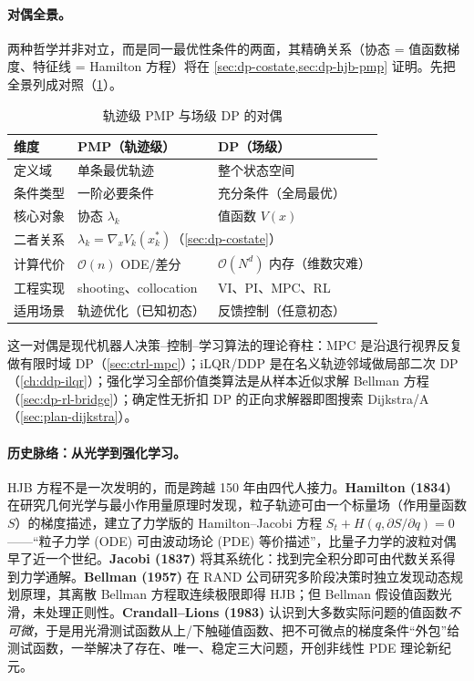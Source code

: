 \paragraph{对偶全景。}
两种哲学并非对立，而是同一最优性条件的两面，其精确关系（协态 = 值函数梯度、特征线 = Hamilton 方程）将在 \cref{sec:dp-costate,sec:dp-hjb-pmp} 证明。先把全景列成对照（\cref{tab:dp-pmp-vs-dp}）。

\begin{table}[H]\centering\small
\caption{轨迹级 PMP 与场级 DP 的对偶}
\label{tab:dp-pmp-vs-dp}
\begin{tabular}{lll}
\toprule
维度 & PMP（轨迹级） & DP（场级） \\
\midrule
定义域 & 单条最优轨迹 & 整个状态空间 \\
条件类型 & 一阶必要条件 & 充分条件（全局最优） \\
核心对象 & 协态 $\lambda_k$ & 值函数 $V(x)$ \\
二者关系 & \multicolumn{2}{l}{$\lambda_k=\nabla_x V_k(x_k^*)$（\cref{sec:dp-costate}）} \\
计算代价 & $\mathcal O(n)$ ODE/差分 & $\mathcal O(N^d)$ 内存（维数灾难） \\
工程实现 & shooting、collocation & VI、PI、MPC、RL \\
适用场景 & 轨迹优化（已知初态） & 反馈控制（任意初态） \\
\bottomrule
\end{tabular}
\end{table}

这一对偶是现代机器人决策--控制--学习算法的理论脊柱：MPC 是沿退行视界反复做有限时域 DP（\cref{sec:ctrl-mpc}）；iLQR/DDP 是在名义轨迹邻域做局部二次 DP（\cref{ch:ddp-ilqr}）；强化学习全部价值类算法是从样本近似求解 Bellman 方程（\cref{sec:dp-rl-bridge}）；确定性无折扣 DP 的正向求解器即图搜索 Dijkstra/A\*（\cref{sec:plan-dijkstra}）。

\paragraph{历史脉络：从光学到强化学习。}
HJB 方程不是一次发明的，而是跨越 150 年由四代人接力。\textbf{Hamilton (1834)} 在研究几何光学与最小作用量原理时发现，粒子轨迹可由一个标量场（作用量函数 $S$）的梯度描述，建立了力学版的 Hamilton--Jacobi 方程 $S_t+H(q,\partial S/\partial q)=0$——“粒子力学 (ODE) 可由波动场论 (PDE) 等价描述”，比量子力学的波粒对偶早了近一个世纪。\textbf{Jacobi (1837)} 将其系统化：找到完全积分即可由代数关系得到力学通解。\textbf{Bellman (1957)} 在 RAND 公司研究多阶段决策时独立发现动态规划原理，其离散 Bellman 方程取连续极限即得 HJB；但 Bellman 假设值函数光滑，未处理正则性。\textbf{Crandall--Lions (1983)} 认识到大多数实际问题的值函数\emph{不可微}，于是用光滑测试函数从上/下触碰值函数、把不可微点的梯度条件“外包”给测试函数，一举解决了存在、唯一、稳定三大问题，开创非线性 PDE 理论新纪元\cite{crandall1983viscosity}。

